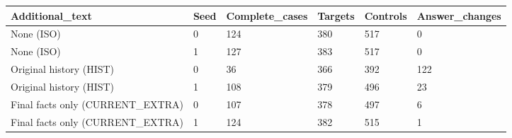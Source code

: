 \begin{tabular}{llllll}
Additional\_text & Seed & Complete\_cases & Targets & Controls & Answer\_changes \\
\hline
None (ISO) & 0 & 124 & 380 & 517 & 0 \\
None (ISO) & 1 & 127 & 383 & 517 & 0 \\
Original history (HIST) & 0 & 36 & 366 & 392 & 122 \\
Original history (HIST) & 1 & 108 & 379 & 496 & 23 \\
Final facts only (CURRENT\_EXTRA) & 0 & 107 & 378 & 497 & 6 \\
Final facts only (CURRENT\_EXTRA) & 1 & 124 & 382 & 515 & 1 \\
\end{tabular}
